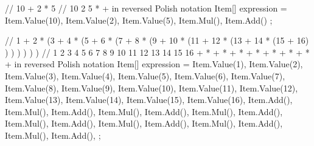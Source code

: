// 10 + 2 * 5
// 10 2 5 * + in reversed Polish notation
Item[] expression = {
Item.Value(10),
Item.Value(2),
Item.Value(5),
Item.Mul(),
Item.Add()
};

// 1 + 2 * (3 + 4 * (5 + 6 * (7 + 8 * (9 + 10 * (11 + 12 * (13 + 14 * (15 + 16) ) ) ) ) ) )
// 1 2 3 4 5 6 7 8 9 10 11 12 13 14 15 16 + * + * + * + * + * + * + * + in reversed Polish notation
Item[] expression = {
Item.Value(1),
Item.Value(2),
Item.Value(3),
Item.Value(4),
Item.Value(5),
Item.Value(6),
Item.Value(7),
Item.Value(8),
Item.Value(9),
Item.Value(10),
Item.Value(11),
Item.Value(12),
Item.Value(13),
Item.Value(14),
Item.Value(15),
Item.Value(16),
Item.Add(),
Item.Mul(),
Item.Add(),
Item.Mul(),
Item.Add(),
Item.Mul(),
Item.Add(),
Item.Mul(),
Item.Add(),
Item.Mul(),
Item.Add(),
Item.Mul(),
Item.Add(),
Item.Mul(),
Item.Add(),
};